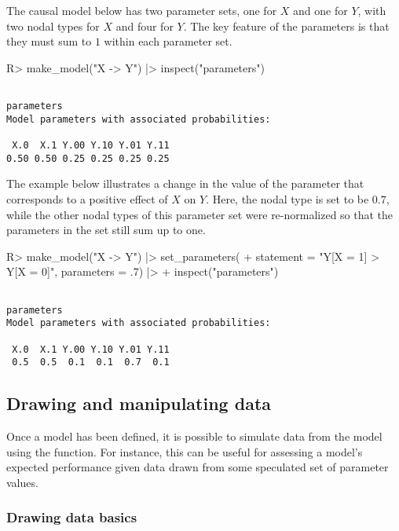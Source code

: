 \documentclass[
  11pt,
  article]{jss}
\renewcommand{\texttt}[1]{\code{#1}}
\begin{document}
The causal model below has two parameter sets, one for \(X\) and one for
\(Y\), with two nodal types for \(X\) and four for \(Y\). The key
feature of the parameters is that they must sum to \(1\) within each
parameter set.

\begin{CodeInput}
R> make_model("X -> Y") |> inspect("parameters")
\end{CodeInput}

\begin{verbatim}

parameters
Model parameters with associated probabilities: 

 X.0  X.1 Y.00 Y.10 Y.01 Y.11 
0.50 0.50 0.25 0.25 0.25 0.25 
\end{verbatim}

The example below illustrates a change in the value of the parameter
that corresponds to a positive effect of \(X\) on \(Y\). Here, the nodal
type \texttt{Y.Y01} is set to be \(0.7\), while the other nodal types of
this parameter set were re-normalized so that the parameters in the set
still sum up to one.

\begin{CodeInput}
R> make_model("X -> Y") |> set_parameters(
+    statement = "Y[X = 1] > Y[X = 0]", parameters = .7) |>
+    inspect("parameters")
\end{CodeInput}

\begin{verbatim}

parameters
Model parameters with associated probabilities: 

 X.0  X.1 Y.00 Y.10 Y.01 Y.11 
 0.5  0.5  0.1  0.1  0.7  0.1 
\end{verbatim}

\subsection{Drawing and manipulating
data}\label{drawing-and-manipulating-data}

Once a model has been defined, it is possible to simulate data from the
model using the \texttt{make\_data()} function. For instance, this can
be useful for assessing a model's expected performance given data drawn
from some speculated set of parameter values.

\subsubsection{Drawing data basics}\label{drawing-data-basics}
\end{document}
